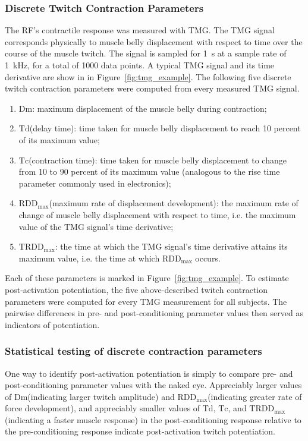 \documentclass[utf8]{style/FrontiersinHarvard}
\newcommand{\Dm}{\ensuremath{\text{Dm}}\xspace}
\newcommand{\Td}{\ensuremath{\text{Td}}\xspace}
\newcommand{\Tc}{\ensuremath{\text{Tc}}\xspace}
\newcommand{\RDDMax}{\ensuremath{ \text{RDD}_{\text{max}}}\xspace}
\newcommand{\RDDMaxTime}{\ensuremath{ \text{TRDD}_{\text{max}}}\xspace}
\begin{document}
\subsubsection{Discrete Twitch Contraction Parameters} \label{sss:discrete_twitch_params}
The RF's contractile response was measured with TMG.
The TMG signal corresponds physically to muscle belly displacement with respect to time over the course of the muscle twitch.
The signal is sampled for \SI{1}{\second} at a sample rate of \SI{1}{\kilo \hertz}, for a total of 1000 data points.
A typical TMG signal and its time derivative are show in in Figure~\ref{fig:tmg_example}.
The following five discrete twitch contraction parameters were computed from every measured TMG signal.
\begin{enumerate}

    \item \Dm: maximum displacement of the muscle belly during contraction;

    \item \Td (delay time): time taken for muscle belly displacement to reach 10 percent of its maximum value;

    \item \Tc (contraction time): time taken for muscle belly displacement to change from 10 to 90 percent of its maximum value (analogous to the rise time parameter commonly used in electronics);

    \item \RDDMax (maximum rate of displacement development): the maximum rate of change of muscle belly displacement with respect to time, i.e. the maximum value of the TMG signal's time derivative;

    \item \RDDMaxTime: the time at which the TMG signal's time derivative attains its maximum value, i.e. the time at which \RDDMax occurs.

\end{enumerate}
Each of these parameters is marked in Figure~\ref{fig:tmg_example}.
To estimate post-activation potentiation, the five above-described twitch contraction parameters were computed for every TMG measurement for all subjects.
The pairwise differences in pre- and post-conditioning parameter values then served as indicators of potentiation.

\subsubsection{Statistical testing of discrete contraction parameters} \label{sss:discrete_twitch_param_stats}
One way to identify post-activation potentiation is simply to compare pre- and post-conditioning parameter values with the naked eye.
Appreciably larger values of \Dm (indicating larger twitch amplitude) and \RDDMax (indicating greater rate of force development), and appreciably smaller values of \Td, \Tc, and \RDDMaxTime (indicating a faster muscle response) in the post-conditioning response relative to the pre-conditioning response indicate post-activation twitch potentiation.
\end{document}
